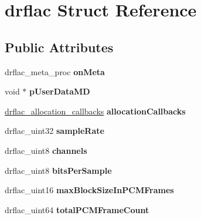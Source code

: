 \hypertarget{structdrflac}{\section{drflac Struct Reference}
\label{structdrflac}
}
\subsection*{Public Attributes}
\begin{DoxyCompactItemize}
\item 
\hypertarget{structdrflac_a6c558b33c91a829405d01cb1a49559af}{drflac\-\_\-meta\-\_\-proc {\bfseries on\-Meta}}\label{structdrflac_a6c558b33c91a829405d01cb1a49559af}

\item 
\hypertarget{structdrflac_a583eb657fbec8f84a1e88753c6f39de2}{void $\ast$ {\bfseries p\-User\-Data\-M\-D}}\label{structdrflac_a583eb657fbec8f84a1e88753c6f39de2}

\item 
\hypertarget{structdrflac_acbb32ceb21a3d676f585763c7523c868}{\hyperlink{structdrflac__allocation__callbacks}{drflac\-\_\-allocation\-\_\-callbacks} {\bfseries allocation\-Callbacks}}\label{structdrflac_acbb32ceb21a3d676f585763c7523c868}

\item 
\hypertarget{structdrflac_ad2556454adc48659e9f15d9b2eb53993}{drflac\-\_\-uint32 {\bfseries sample\-Rate}}\label{structdrflac_ad2556454adc48659e9f15d9b2eb53993}

\item 
\hypertarget{structdrflac_a6e016a68a3187aab1af97fe7d2719f6d}{drflac\-\_\-uint8 {\bfseries channels}}\label{structdrflac_a6e016a68a3187aab1af97fe7d2719f6d}

\item 
\hypertarget{structdrflac_a7171edaabeda9c472d5a9329d7f32fcc}{drflac\-\_\-uint8 {\bfseries bits\-Per\-Sample}}\label{structdrflac_a7171edaabeda9c472d5a9329d7f32fcc}

\item 
\hypertarget{structdrflac_a87b16d0a16ac9f92901786116c9abd1f}{drflac\-\_\-uint16 {\bfseries max\-Block\-Size\-In\-P\-C\-M\-Frames}}\label{structdrflac_a87b16d0a16ac9f92901786116c9abd1f}

\item 
\hypertarget{structdrflac_a928a3033601ed8e6e4bcdd5ffdd0d5b4}{drflac\-\_\-uint64 {\bfseries total\-P\-C\-M\-Frame\-Count}}\label{structdrflac_a928a3033601ed8e6e4bcdd5ffdd0d5b4}


\end{DoxyCompactItemize}
